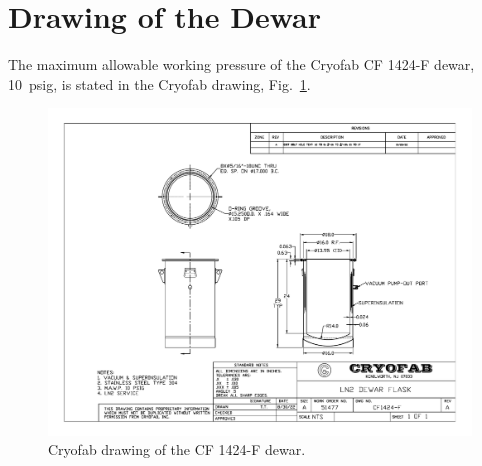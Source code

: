 \section{Drawing of the Dewar}
\label{app:dewar_drawing}

The maximum allowable working pressure of the Cryofab CF 1424-F dewar,
10~psig,
is stated in the Cryofab drawing, Fig.~\ref{fig:dewar}.

\begin{figure}[h]
    \centering
    \includegraphics[width=\textwidth]{fig/DewarDrawing.pdf}
    \caption{Cryofab drawing of the CF 1424-F dewar.}
    \label{fig:dewar}
\end{figure}
